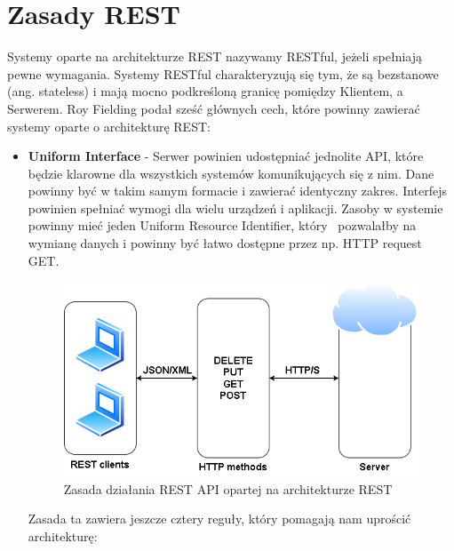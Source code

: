 \documentclass[oneside,polski,logo,indent]{amuthesis}
\begin{document}

\section{Zasady REST}

Systemy oparte na architekturze REST nazywamy RESTful, jeżeli spełniają pewne wymagania. Systemy RESTful charakteryzują się tym, że są bezstanowe (ang. stateless) i mają mocno podkreśloną granicę pomiędzy Klientem, a Serwerem. Roy Fielding podał sześć głównych cech, które powinny zawierać systemy oparte o architekturę REST: 
 
\begin{itemize}
\item \textbf{Uniform Interface} - Serwer powinien udostępniać jednolite API, które będzie klarowne dla wszystkich systemów komunikujących się z nim. Dane powinny być w takim samym formacie i zawierać identyczny zakres. Interfejs powinien spełniać wymogi dla wielu urządzeń i aplikacji. Zasoby w systemie powinny mieć jeden Uniform Resource Identifier, który~ pozwalałby na wymianę danych i powinny być łatwo dostępne przez np. HTTP request GET.
\begin{figure}[H]
\centering
\includegraphics[width=14cm]{restarch.png}
\caption{Zasada działania REST API opartej na architekturze REST}
\label{REST API}
\end{figure}


Zasada ta zawiera jeszcze cztery reguły, który pomagają nam uprościć architekturę: 


\end{itemize}
\end{document}
